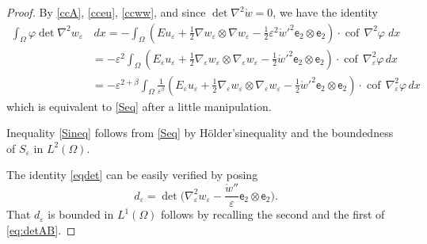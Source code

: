 \documentclass[a4, 11pt, reqno, final]{amsart}
\newcommand\e{\varepsilon}
\theoremstyle{plain}%
\newcommand{\QED}{\hspace{1ex}\hfill$\blacksquare$\vspace{2ex}}
\DeclareMathOperator{\cof}{cof\,}
\begin{document}
	\begin{proof}
		By \eqref{ccA}, \eqref{cceu}, \eqref{ccww}, and since $\det\nabla^2 \mathring{w} = 0$, we have the identity
		\begin{equation}
			\begin{aligned}
				\int_{\Omega} \varphi \det\nabla^2 w_\e &\, dx = -\int_{\Omega} (E u_\e+ \frac12 \nabla w_\e \otimes \nabla w_\e -\frac12 \e^2 \mathring{w}'^2 \mathsf{e}_2\otimes \mathsf{e}_2) \cdot \cof\nabla^2 \varphi \; dx\\
				&= -\e^2\int_{\Omega} (E_\e u_\e+ \frac12 \nabla_\e w_\e \otimes \nabla_\e w_\e -\frac12 \mathring{w}'^2 \mathsf{e}_2\otimes \mathsf{e}_2) \cdot \cof\nabla^2_\e \varphi \, dx\\
				&= -\e^{2+\beta}\int_{\Omega} \frac{1}{\e^\beta}(E_\e u_\e+ \frac12 \nabla_\e w_\e \otimes \nabla_\e w_\e -\frac12 \mathring{w}'^2 \mathsf{e}_2\otimes \mathsf{e}_2) \cdot \cof\nabla^2_\e \varphi \, dx
			\end{aligned}
		\end{equation}
		which is equivalent to \eqref{Seq} after a little manipulation.

		Inequality \eqref{Sineq} follows from \eqref{Seq} by H\"older'sinequality and the boundedness of $S_\e$ in $L^2(\Omega)$.

		The identity \eqref{eqdet} can be easily verified by posing
		$$d_\e=\det \big(\nabla^2_\e w_\e-\frac{\mathring{w}''}{\e}\mathsf{e}_2 \otimes \mathsf{e}_2\big).$$
		That $d_\e$ is bounded in $L^1(\Omega)$ follows by recalling the second and the first of \eqref{eq:detAB}.
	\end{proof}
\end{document}
